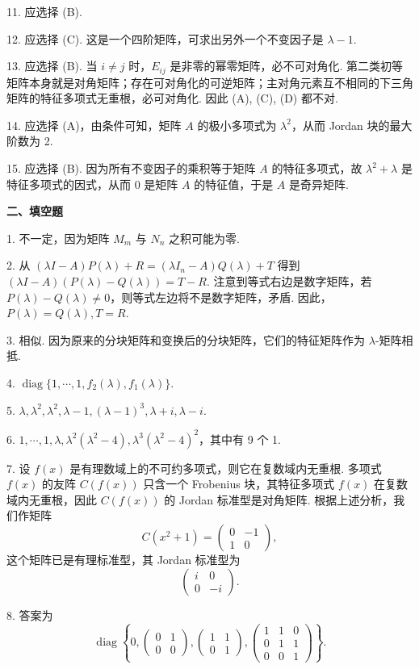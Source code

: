 \documentclass[UTF8,12pt,a4paper,fontset=fandol]{ctexart}
\begin{document}
11. 应选择 (B).

12. 应选择 (C). 这是一个四阶矩阵，可求出另外一个不变因子是 $\lambda-1$.

13. 应选择 (B). 当 $i\ne j$ 时，$E_{ij}$ 是非零的幂零矩阵，必不可对角化. 第二类初等矩阵本身就是对角矩阵；存在可对角化的可逆矩阵；主对角元素互不相同的下三角矩阵的特征多项式无重根，必可对角化. 因此 (A), (C), (D) 都不对.

14. 应选择 (A)，由条件可知，矩阵 $A$ 的极小多项式为 $\lambda^2$，从而 Jordan 块的最大阶数为 2.

15. 应选择 (B). 因为所有不变因子的乘积等于矩阵 $A$ 的特征多项式，故 $\lambda^2+\lambda$ 是特征多项式的因式，从而 0 是矩阵 $A$ 的特征值，于是 $A$ 是奇异矩阵.

\noindent\textbf{二、填空题}

1. 不一定，因为矩阵 $M_m$ 与 $N_n$ 之积可能为零.

2. 从 $(\lambda I-A)P(\lambda)+R=(\lambda I_n-A)Q(\lambda)+T$ 得到 $(\lambda I-A)(P(\lambda)-Q(\lambda))=T-R$. 注意到等式右边是数字矩阵，若 $P(\lambda)-Q(\lambda)\ne0$，则等式左边将不是数字矩阵，矛盾. 因此，$P(\lambda)=Q(\lambda),T=R$.

3. 相似. 因为原来的分块矩阵和变换后的分块矩阵，它们的特征矩阵作为 $\lambda$-矩阵相抵.

4. $\operatorname{diag}\{1,\cdots,1,f_2(\lambda),f_1(\lambda)\}$.

5. $\lambda,\lambda^2,\lambda^2,\lambda-1,(\lambda-1)^3,\lambda+i,\lambda-i$.

6. $1,\cdots,1,\lambda,\lambda^2(\lambda^2-4),\lambda^3(\lambda^2-4)^2$，其中有 9 个 1.

7. 设 $f(x)$ 是有理数域上的不可约多项式，则它在复数域内无重根. 多项式 $f(x)$ 的友阵 $C(f(x))$ 只含一个 Frobenius 块，其特征多项式 $f(x)$ 在复数域内无重根，因此 $C(f(x))$ 的 Jordan 标准型是对角矩阵. 根据上述分析，我们作矩阵
\[
C(x^2+1)=\left(\begin{array}{rr}0&-1\\1&0\end{array}\right),
\]
这个矩阵已是有理标准型，其 Jordan 标准型为
\[
\left(\begin{array}{cc}i&0\\0&-i\end{array}\right).
\]

8. 答案为
\[
\operatorname{diag}\left\{0,\left(\begin{array}{cc}0&1\\0&0\end{array}\right),\left(\begin{array}{cc}1&1\\0&1\end{array}\right),\left(\begin{array}{ccc}1&1&0\\0&1&1\\0&0&1\end{array}\right)\right\}.
\]
\end{document}
